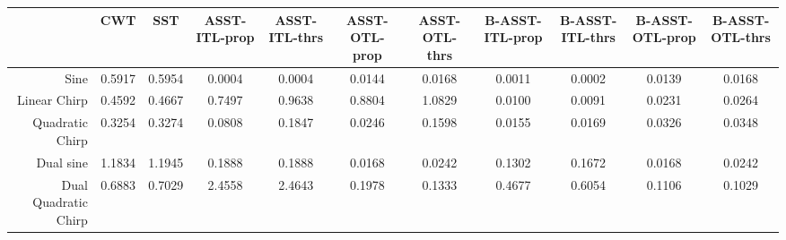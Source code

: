 \begin{tabular}{|r|c|c|c|c|c|c|c|c|c|c|}
\toprule
 & CWT & SST & ASST-ITL-prop & ASST-ITL-thrs & ASST-OTL-prop & ASST-OTL-thrs & B-ASST-ITL-prop & B-ASST-ITL-thrs & B-ASST-OTL-prop & B-ASST-OTL-thrs \\
\midrule
Sine & 0.5917 & 0.5954 & 0.0004 & 0.0004 & 0.0144 & 0.0168 & 0.0011 & 0.0002 & 0.0139 & 0.0168 \\
Linear Chirp & 0.4592 & 0.4667 & 0.7497 & 0.9638 & 0.8804 & 1.0829 & 0.0100 & 0.0091 & 0.0231 & 0.0264 \\
Quadratic Chirp & 0.3254 & 0.3274 & 0.0808 & 0.1847 & 0.0246 & 0.1598 & 0.0155 & 0.0169 & 0.0326 & 0.0348 \\
Dual sine & 1.1834 & 1.1945 & 0.1888 & 0.1888 & 0.0168 & 0.0242 & 0.1302 & 0.1672 & 0.0168 & 0.0242 \\
Dual Quadratic Chirp & 0.6883 & 0.7029 & 2.4558 & 2.4643 & 0.1978 & 0.1333 & 0.4677 & 0.6054 & 0.1106 & 0.1029 \\
\bottomrule
\end{tabular}
